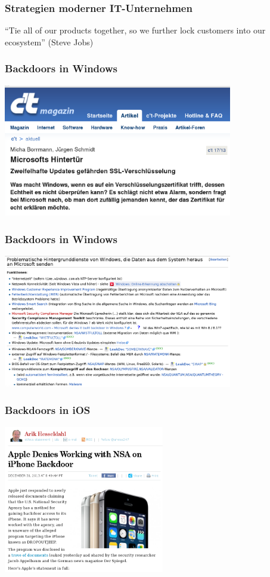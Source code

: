 \documentclass[12pt]{beamer}
\begin{document}
\begin{frame}
  \frametitle{Strategien moderner IT-Unternehmen}
  \begin{center}
    ``Tie all of our products together, so we further lock customers into our ecosystem'' (Steve Jobs)
  \end{center}
\end{frame}

\begin{frame}
  \frametitle{Backdoors in Windows}
  \begin{center}
    \includegraphics[width=10cm]{img/backdoor-windows}
  \par\end{center}
\end{frame}

\begin{frame}
  \frametitle{Backdoors in Windows}
  \begin{center}
    \includegraphics[width=10cm]{img/backdoor-windows2}
  \par\end{center}
\end{frame}

\begin{frame}
  \frametitle{Backdoors in iOS}
  \begin{center}
    \includegraphics[width=7cm]{img/backdoor-ios}
  \par\end{center}
\end{frame}
\end{document}
